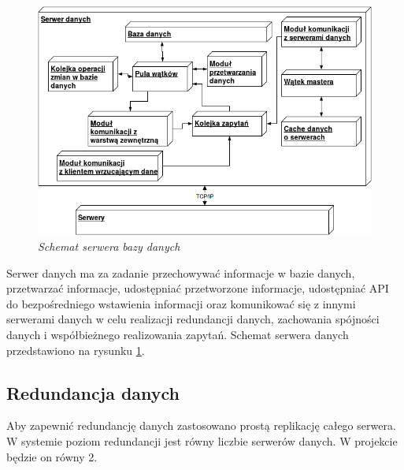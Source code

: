 \begin{figure}[!h]
    \begin{center}
    \includegraphics[angle=0,scale=0.6]{img/data_serv.png}
    \end{center}
    \caption{\em Schemat serwera bazy danych}
    \label{fig:db}
\end{figure}

Serwer danych ma za zadanie przechowywać informacje w bazie danych, przetwarzać informacje, udostępniać przetworzone informacje, udostępniać API do bezpośredniego wstawienia informacji oraz komunikować się z innymi serwerami danych w celu realizacji redundancji danych, zachowania spójności danych i współbieżnego realizowania zapytań. Schemat serwera danych przedstawiono na rysunku \ref{fig:db}.

\subsection{Redundancja danych}
Aby zapewnić redundancję danych zastosowano prostą replikację całego serwera. W systemie poziom redundancji jest równy liczbie serwerów danych. W projekcie będzie on równy 2.
